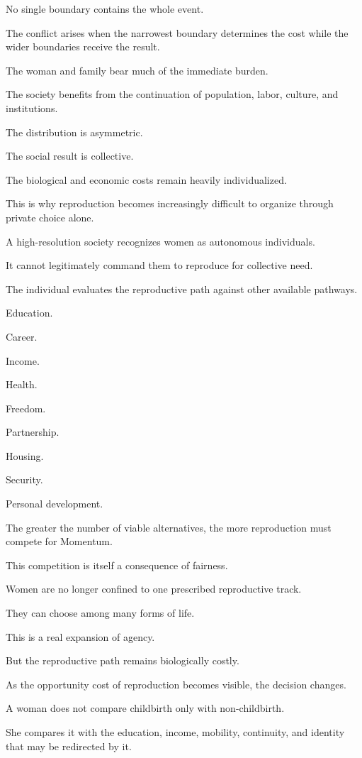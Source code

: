No single boundary contains the whole event.

The conflict arises when the narrowest boundary determines the cost while the wider boundaries receive the result.

The woman and family bear much of the immediate burden.

The society benefits from the continuation of population, labor, culture, and institutions.

The distribution is asymmetric.

The social result is collective.

The biological and economic costs remain heavily individualized.

This is why reproduction becomes increasingly difficult to organize through private choice alone.

A high-resolution society recognizes women as autonomous individuals.

It cannot legitimately command them to reproduce for collective need.

The individual evaluates the reproductive path against other available pathways.

Education.

Career.

Income.

Health.

Freedom.

Partnership.

Housing.

Security.

Personal development.

The greater the number of viable alternatives, the more reproduction must compete for Momentum.

This competition is itself a consequence of fairness.

Women are no longer confined to one prescribed reproductive track.

They can choose among many forms of life.

This is a real expansion of agency.

But the reproductive path remains biologically costly.

As the opportunity cost of reproduction becomes visible, the decision changes.

A woman does not compare childbirth only with non-childbirth.

She compares it with the education, income, mobility, continuity, and identity that may be redirected by it.


